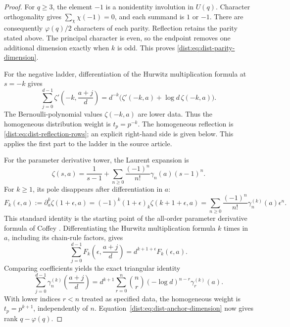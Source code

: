 \begin{proof}
For \(q\geq3\), the element \(-1\) is a nonidentity involution in
\(U(q)\). Character orthogonality gives
\(\sum_\chi\chi(-1)=0\), and each summand is \(1\) or \(-1\).
There are consequently \(\varphi(q)/2\) characters of each parity.
Reflection retains the parity stated above. The principal
character is even, so the endpoint removes one additional
dimension exactly when \(k\) is odd. This proves
\eqref{dist:eq:dist-parity-dimension}.

For the negative ladder, differentiation of the Hurwitz
multiplication formula at \(s=-k\) gives
\begin{equation}
 \sum_{j=0}^{d-1}
 \zeta'\!\left(-k,\frac{a+j}{d}\right)
 =d^{-k}\bigl(\zeta'(-k,a)+\log d\,\zeta(-k,a)\bigr).
 \label{dist:eq:dist-negative-jet}
\end{equation}
The Bernoulli-polynomial values \(\zeta(-k,a)\) are lower data.
Thus the homogeneous distribution weight is \(t_p=p^{-k}\).
The homogeneous reflection is
\eqref{dist:eq:dist-reflection-rows}; an explicit right-hand side is
given below. This applies the first part to the ladder in the
source article.

For the parameter derivative tower, the Laurent expansion is
\begin{equation}
 \zeta(s,a)=\frac1{s-1}
   +\sum_{n\geq0}\frac{(-1)^n}{n!}\gamma_n(a)(s-1)^n.
 \label{dist:eq:dist-stieltjes-laurent}
\end{equation}
For \(k\geq1\), its pole disappears after differentiation in \(a\):
\begin{equation}
 F_k(\epsilon,a):=
 \partial_a^k\zeta(1+\epsilon,a)
 =(-1)^k(1+\epsilon)_k\zeta(k+1+\epsilon,a)
 =\sum_{n\geq0}\frac{(-1)^n}{n!}
          \gamma_n^{(k)}(a)\epsilon^n.
 \label{dist:eq:dist-stieltjes-generating}
\end{equation}
This standard identity is the starting point of the all-order
parameter derivative formula of Coffey \cite{stieltjes:Coffey}.
Differentiating the Hurwitz multiplication formula \(k\) times
in \(a\), including its chain-rule factors, gives
\[
 \sum_{j=0}^{d-1}
 F_k\!\left(\epsilon,\frac{a+j}{d}\right)
 =d^{k+1+\epsilon}F_k(\epsilon,a).
\]
Comparing coefficients yields the exact triangular identity
\begin{equation}
 \sum_{j=0}^{d-1}
 \gamma_n^{(k)}\!\left(\frac{a+j}{d}\right)
 =d^{k+1}\sum_{r=0}^{n}
   \binom nr(-\log d)^{n-r}\gamma_r^{(k)}(a).
 \label{dist:eq:dist-stieltjes-multiplication}
\end{equation}
With lower indices \(r<n\) treated as specified data, the
homogeneous weight is \(t_p=p^{k+1}\), independently of \(n\).
Equation~\eqref{dist:eq:dist-anchor-dimension} now gives rank
\(q-\varphi(q)\).
\end{proof}

